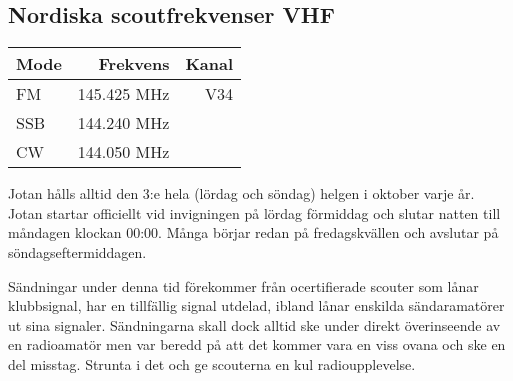\subsection{Nordiska scoutfrekvenser VHF}

\begin{center}
\begin{tabular}{lrr}
	\textbf{Mode} & \textbf{Frekvens} & \textbf{Kanal} \\ \hline
	FM            &      145.425  MHz &   V34 \\
	SSB           &      144.240  MHz &  \\
	CW            &      144.050  MHz &
\end{tabular}
\end{center}

Jotan hålls alltid den 3:e hela (lördag och söndag) helgen i oktober varje år. Jotan startar officiellt vid invigningen på lördag förmiddag och slutar natten till måndagen klockan 00:00. Många börjar redan på fredagskvällen och avslutar på söndagseftermiddagen.

Sändningar under denna tid förekommer från ocertifierade scouter som lånar klubbsignal, har en tillfällig signal utdelad, ibland lånar enskilda sändaramatörer ut sina signaler. Sändningarna skall dock alltid ske under direkt överinseende av en radioamatör men var beredd på att det kommer vara en
viss ovana och ske en del misstag. Strunta i det och ge scouterna en kul radioupplevelse.

